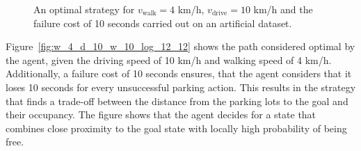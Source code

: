 \begin{figure}[p]
\begin{center}
\hspace{2mm}
\end{center}
\caption{An optimal strategy for $v_{\mathrm{walk}} = 4$ km/h, $v_{\mathrm{drive}} = 10$ km/h and the failure cost of 10 seconds carried out on an artificial dataset.}
\label{fig:w_4_d_10_w_10_artificial}
\end{figure}


Figure~\ref{fig:w_4_d_10_w_10_log_12_12} shows the path considered optimal by
the agent, given the driving speed of 10 km/h and walking speed of 4 km/h.
Additionally, a failure cost of 10 seconds ensures, that the agent considers
that it loses 10 seconds for every unsuccessful parking action. This results
in the strategy that finds a trade-off between the distance from the parking
lots to the goal and their occupancy. The figure shows that the agent decides
for a state that combines close proximity to the goal state with locally high
probability of being free.

